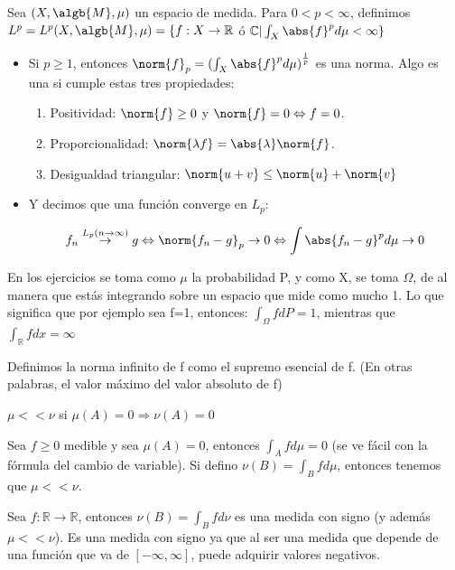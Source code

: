 \documentclass{apuntes}
\begin{document}
\begin{defn}
Sea $(X, \algb{M}, \mu)$ un espacio de medida. Para $0<p<\infty$, definimos $L^p=L^p(X,\algb{M},\mu)=\{f:X\rightarrow \mathbb{R}$ ó $\mathbb{C} | \int_X \abs{f}^p d\mu < \infty\}$

\begin{itemize}
\item Si $p \geq 1$, entonces $\norm{f}_p = (\int_X {\abs{f}^p d\mu)}^{\frac{1}{p}}$ es una norma. Algo es una si cumple estas tres propiedades:
\begin{enumerate}
\item Positividad: $\norm{f}\geq 0$ y $\norm{f} = 0 \Leftrightarrow f=0$.
\item Proporcionalidad: $\norm{\lambda f} = \abs{\lambda}\norm{f}$.
\item Desigualdad triangular: $\norm{u+v} \leq \norm{u}+\norm{v}$
\end{enumerate}
\item Y decimos que una función converge en $L_p$:

\[
f_n \stackrel{L_p (n\rightarrow \infty)}{\rightarrow} g \Leftrightarrow \norm{f_n -g}_p  \rightarrow 0 \Leftrightarrow \int{\abs{f_n -g}^pd\mu} \rightarrow 0
\]
\end{itemize}

\obs En los ejercicios se toma como $\mu$ la probabilidad P, y como X, se toma $\Omega$, de al manera que estás integrando sobre un espacio que mide como mucho 1. Lo que significa que por ejemplo sea f=1, entonces: $\int_{\Omega}fdP = 1$, mientras que $\int_{\mathbb{R}}fdx = \infty$

\obs Definimos la norma infinito de f como el supremo esencial de f. (En otras palabras, el valor máximo del valor absoluto de f)


\end{defn}

\begin{defn}
$\mu << \nu$ si $\mu(A)=0 \Rightarrow \nu(A)=0$

\begin{example}
Sea $f \geq 0$ medible y sea $\mu(A)=0$, entonces $\int_Afd\mu=0$ (se ve fácil con la fórmula del cambio de variable). Si defino $\nu(B)=\int_B fd\mu$, entonces tenemos que $\mu << \nu$.
\end{example}
\end{defn}

\begin{defn}
Sea $f:\mathbb{R}\rightarrow \mathbb{R}$, entonces $\nu(B)=\int_B fd\nu$ es una medida con signo (y además $\mu << \nu$). Es una medida con signo ya que al ser una medida que depende de una función que va de $[-\infty, \infty]$, puede adquirir valores negativos.
\end{defn}
\end{document}
